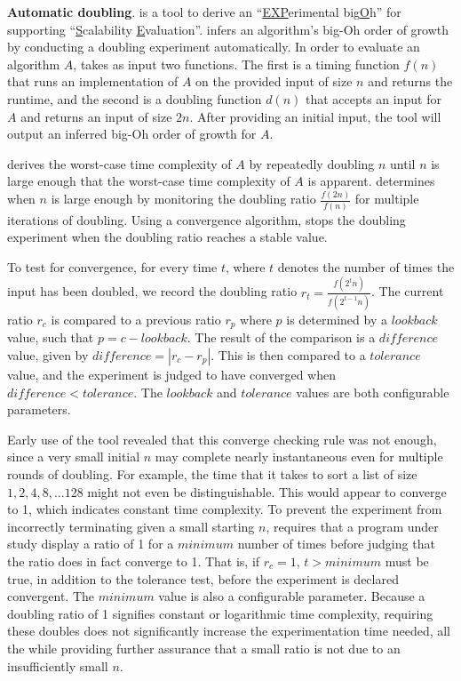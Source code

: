 {\bf Automatic doubling}.
    \toolname \cite{kinneer2015,tool} is a tool to derive an
    ``\underline{EXP}erimental big\underline{O}h'' for supporting
    ``\underline{S}calability \underline{E}valuation''.
    \toolname infers an algorithm's big-Oh order of growth by
    conducting a doubling experiment automatically.  In order to
    evaluate an algorithm $A$, \toolname takes as input two
    functions. The first is a timing function $f(n)$ that runs an
    implementation of $A$ on the provided input of size $n$ and returns
    the runtime, and the second is a doubling function $d(n)$ that
    accepts an input for $A$ and returns an input of size $2n$. After providing \toolname an initial input, the tool
    will output an inferred big-Oh order of growth for $A$.

    \toolname derives the worst-case time complexity of $A$ by
    repeatedly doubling $n$ until $n$ is large enough that the
    worst-case time complexity of $A$ is apparent.  \toolname
    determines when $n$ is large enough by monitoring the doubling
    ratio $\frac{f(2n)}{f(n)}$ for multiple iterations of doubling.
    Using a convergence algorithm, \toolname stops the doubling experiment
    when the doubling ratio reaches a stable value.
   
  To test for convergence, for every time $t$, where $t$ denotes the number of times the input has been doubled, we
  record the doubling ratio $r_t = \frac{f(2^t n)}{f(2^{t-1}n)}$. The current ratio $r_c$ is compared to a previous
  ratio $r_p$ where $p$ is determined by a $\mathit{lookback}$ value, such that $p=c-\mathit{lookback}$.  The result of
  the comparison is a $\mathit{difference}$ value, given by $\mathit{difference} = |r_c - r_p|$.  This is then compared
  to a $\mathit{tolerance}$ value, and the experiment is judged to have converged when $\mathit{difference}<\mathit{tolerance}$.
  The $\mathit{lookback}$ and $\mathit{tolerance}$ values are both configurable parameters.

  Early use of the tool revealed that this converge checking rule was
  not enough, since a very small initial $n$ may complete nearly
  instantaneous even for multiple rounds of doubling.  For example, the
  time that it takes to sort a list of size $1, 2, 4, 8, \dots 128$
  might not even be distinguishable. This would appear to converge to 1, which 
  indicates constant time complexity. To prevent the experiment from incorrectly terminating
  given a small starting $n$, \toolname requires that a program under study display a ratio of 1 for a
  $\mathit{minimum}$ number of times before judging that the ratio does in fact converge to 1.  That is, if $r_c = 1$,
  $t > \mathit{minimum}$ must be true, in addition to the tolerance test, before the experiment is declared convergent.
  The $\mathit{minimum}$ value is also a configurable parameter.  Because a doubling ratio of 1 signifies
  constant or logarithmic time complexity, requiring these doubles does not significantly increase the experimentation
  time needed, all the while providing further assurance that a small ratio is not due to an insufficiently small $n$.



